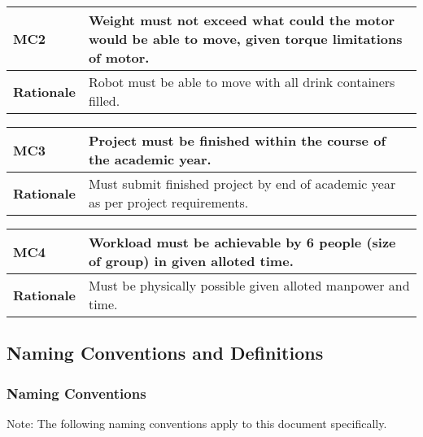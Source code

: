 \documentclass [11pt]{article}
\begin{document}
\begin{longtable}{| p{ } | p{ } | }\hline 
\rowcolor{tableCell}\textbf{MC2}& \textbf{Weight must not exceed what could the motor would be able to move, given torque limitations of motor.}\\ \hline 
\textbf{Rationale} & Robot must be able to move with all drink containers filled.\\ \hline 
\end{longtable}

\begin{longtable}{| p{ } | p{ } | }\hline 
\rowcolor{tableCell}\textbf{MC3} & \textbf{Project must be finished within the course of the academic year.} \\ \hline
\textbf{Rationale} & Must submit finished project by end of academic year as per project requirements.\\ \hline
\end{longtable}

\begin{longtable}{| p{ } | p{ } | }\hline 
\rowcolor{tableCell}\textbf{MC4} & \textbf{Workload must be achievable by 6 people (size of group) in given alloted time.} \\ \hline
\textbf{Rationale} & Must be physically possible given alloted manpower and time.\\ \hline
\end{longtable}

\subsection{Naming Conventions and Definitions}

\subsubsection{Naming Conventions}
Note: The following naming conventions apply to this document specifically. 
%
%
%
%
%
%
%
\end{document}
